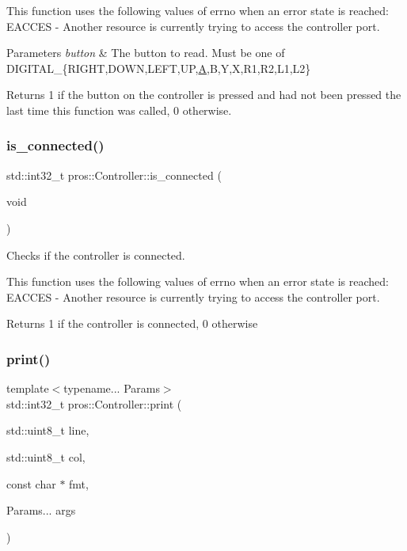 This function uses the following values of errno when an error state is reached\+: E\+A\+C\+C\+ES -\/ Another resource is currently trying to access the controller port.


\begin{DoxyParams}{Parameters}
{\em button} & The button to read. Must be one of D\+I\+G\+I\+T\+A\+L\+\_\+\{R\+I\+G\+HT,D\+O\+WN,L\+E\+FT,UP,\mbox{\hyperlink{structA}{A}},B,Y,X,R1,R2,L1,L2\}\\
\hline
\end{DoxyParams}
\begin{DoxyReturn}{Returns}
1 if the button on the controller is pressed and had not been pressed the last time this function was called, 0 otherwise. 
\end{DoxyReturn}
\mbox{\label{classpros_1_1Controller_a1a013e9cf1979487f2daabcd729d3ecb}} 
\subsubsection{\texorpdfstring{is\_connected()}{is\_connected()}}
{\footnotesize\ttfamily std\+::int32\+\_\+t pros\+::\+Controller\+::is\+\_\+connected (\begin{DoxyParamCaption}\item[{void}]{ }\end{DoxyParamCaption})}



Checks if the controller is connected. 

This function uses the following values of errno when an error state is reached\+: E\+A\+C\+C\+ES -\/ Another resource is currently trying to access the controller port.

\begin{DoxyReturn}{Returns}
1 if the controller is connected, 0 otherwise 
\end{DoxyReturn}
\mbox{\label{classpros_1_1Controller_a4a301df3d34578661271f9b400da1176}} 
\subsubsection{\texorpdfstring{print()}{print()}}
{\footnotesize\ttfamily template$<$typename... Params$>$ \\
std\+::int32\+\_\+t pros\+::\+Controller\+::print (\begin{DoxyParamCaption}\item[{std\+::uint8\+\_\+t}]{line,  }\item[{std\+::uint8\+\_\+t}]{col,  }\item[{const char $\ast$}]{fmt,  }\item[{Params...}]{args }\end{DoxyParamCaption})\hspace{0.3cm}{\ttfamily [inline]}}



